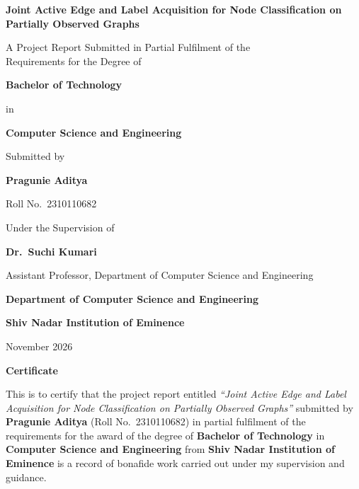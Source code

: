 \documentclass[12pt,a4paper,oneside]{report}
\newcommand{\reporttitle}{Joint Active Edge and Label Acquisition for Node Classification on Partially Observed Graphs}
\newcommand{\studentname}{Pragunie Aditya}
\newcommand{\rollno}{2310110682}
\newcommand{\supervisor}{Dr.\ Suchi Kumari}
\newcommand{\supervisortitle}{Assistant Professor, Department of Computer Science and Engineering}
\newcommand{\university}{Shiv Nadar Institution of Eminence}
\newcommand{\department}{Department of Computer Science and Engineering}
\newcommand{\reportdate}{November 2026}
\begin{document}
\begin{titlepage}
\centering
\vspace*{0.8cm}
{\LARGE\bfseries \reporttitle \par}
\vspace{1.5cm}
{\large A Project Report Submitted in Partial Fulfilment of the\\
Requirements for the Degree of\par}
\vspace{0.6cm}
{\Large\bfseries Bachelor of Technology\par}
\vspace{0.2cm}
{\large in\par}
\vspace{0.2cm}
{\Large\bfseries Computer Science and Engineering\par}
\vspace{1.8cm}
{\large Submitted by\par}
\vspace{0.3cm}
{\Large\bfseries \studentname\par}
\vspace{0.1cm}
{\large Roll No.\ \rollno\par}
\vspace{1.8cm}
{\large Under the Supervision of\par}
\vspace{0.3cm}
{\Large\bfseries \supervisor\par}
\vspace{0.1cm}
{\large \supervisortitle\par}
\vfill
\vspace{2.5cm}
{\large\bfseries \department\par}
{\large\bfseries \university\par}
\vspace{0.3cm}
{\large \reportdate\par}
\end{titlepage}

\newpage
\thispagestyle{empty}
\begin{center}
{\Large\bfseries Certificate}
\end{center}
\vspace{1cm}

This is to certify that the project report entitled \textit{``\reporttitle''} submitted by \textbf{\studentname} (Roll No.\ \rollno) in partial fulfilment of the requirements for the award of the degree of \textbf{Bachelor of Technology} in \textbf{Computer Science and Engineering} from \textbf{\university} is a record of bonafide work carried out under my supervision and guidance.
\end{document}
